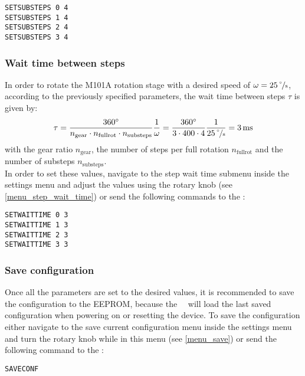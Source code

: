 \texttt{SETSUBSTEPS 0 4}\\
\texttt{SETSUBSTEPS 1 4}\\
\texttt{SETSUBSTEPS 2 4}\\
\texttt{SETSUBSTEPS 3 4}

\subsubsection{Wait time between steps}
In order to rotate the M101A rotation stage with a desired speed of $\omega = \unit[25]{\nicefrac{^{\circ}}{s}}$, according to the previously specified parameters, the wait time between steps $\tau$ is given by:
\[
\tau = \frac{360^{\circ}}{n_{\textrm{gear}} \cdot n_{\textrm{fullrot}} \cdot n_{\textrm{substeps}}} \frac{1}{\omega} = \frac{360^{\circ}}{3 \cdot 400 \cdot 4} \frac{1}{\unit[25]{\nicefrac{^{\circ}}{s}}} =  \unit[3]{ms}
\]
with the gear ratio $n_{\textrm{gear}}$, the number of steps per full rotation $n_{\textrm{fullrot}}$ and the number of substeps $n_{\textrm{substeps}}$.\\
In order to set these values, navigate to the step wait time submenu inside the settings menu and adjust the values using the rotary knob (see \ref{menu_step_wait_time}) or send the following commands to the \productName : 

\texttt{SETWAITTIME 0 3}\\
\texttt{SETWAITTIME 1 3}\\
\texttt{SETWAITTIME 2 3}\\
\texttt{SETWAITTIME 3 3}

\subsubsection{Save configuration}
Once all the parameters are set to the desired values, it is recommended to save the configuration to the EEPROM, because the \productNumber ~\productName ~will load the last saved configuration when powering on or resetting the device. To save the configuration either navigate to the save current configuration menu inside the settings menu and turn the rotary knob while in this menu (see \ref{menu_save}) or send the following command to the \productName : 

\texttt{SAVECONF}

